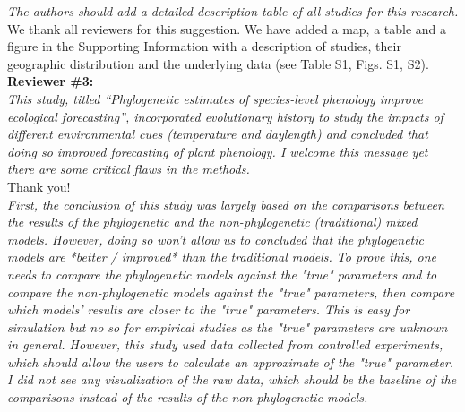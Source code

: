 \documentclass[11pt]{article}
\begin{document}
\emph{The authors should add a detailed description table of all studies for this research.}\\
We thank all reviewers for this suggestion. We have added a map, a table and a figure in the Supporting Information with a description of studies, their geographic distribution and the underlying data (see Table S1, Figs. S1, S2).\\ %



{\bf Reviewer \#3:}\\

\emph{This study, titled “Phylogenetic estimates of species-level phenology improve ecological forecasting”, incorporated evolutionary history to study the impacts of different environmental cues (temperature and daylength) and concluded that doing so improved forecasting of plant phenology. I welcome this message yet there are some critical flaws in the methods.}\\

Thank you!\\

\emph{First, the conclusion of this study was largely based on the comparisons between the results of the phylogenetic and the non-phylogenetic (traditional) mixed models. However, doing so won't allow us to concluded that the phylogenetic models are *better / improved* than the traditional models. To prove this, one needs to compare the phylogenetic models against the "true" parameters and to compare the non-phylogenetic models against the "true" parameters, then compare which models' results are closer to the "true" parameters. This is easy for simulation but no so for empirical studies as the "true" parameters are unknown in general. However, this study used data collected from controlled experiments, which should allow the users to calculate an approximate of the "true" parameter. I did not see any visualization of the raw data, which should be the baseline of the comparisons instead of the results of the non-phylogenetic models.}\\
\end{document}
